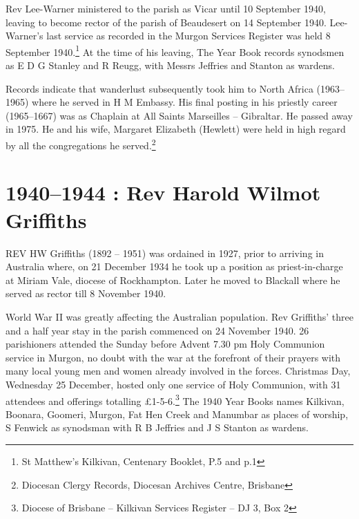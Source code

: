 Rev Lee-Warner ministered to the parish as Vicar until 10 September 1940, leaving to become rector of the parish of Beaudesert on 14 September 1940. Lee-Warner's last service as recorded in the Murgon Services Register was held 8 September 1940.\footnote{St Matthew's Kilkivan, Centenary Booklet, P.5 and p.1} At the time of his leaving, The Year Book records synodsmen as E D G Stanley and R Reugg, with Messrs Jeffries and Stanton as wardens.


Records indicate that wanderlust subsequently took him to North Africa (1963--1965) where he served in H M Embassy. His final posting in his priestly career (1965--1667) was as Chaplain at All Saints Marseilles -- Gibraltar. He passed away in 1975. He and his wife, Margaret Elizabeth (Hewlett) were held in high regard by all the congregations he served.\footnote{Diocesan Clergy Records, Diocesan Archives Centre, Brisbane}


\balance


\printendnotes[custom]
\setcounter{endnote}{0}
\chapter{1940--1944 : Rev Harold Wilmot Griffiths}
\nobalance


\lettrine[lines=3]{R}{EV}
 HW Griffiths (1892 -- 1951) was ordained in 1927, prior to arriving in Australia where, on 21 December 1934 he took up a position as priest-in-charge at Miriam Vale, diocese of Rockhampton. Later he moved to Blackall where he served as rector till 8 November 1940.

World War II was greatly affecting the Australian population. Rev Griffiths' three and a half year stay in the parish commenced on 24 November 1940. 26 parishioners attended the Sunday before Advent 7.30 pm Holy Communion service in Murgon, no doubt with the war at the forefront of their prayers with many local young men and women already involved in the forces. Christmas Day, Wednesday 25 December, hosted only one service of Holy Communion, with 31 attendees and offerings totalling \pounds1-5-6.\footnote{Diocese of Brisbane -- Kilkivan Services Register -- DJ 3, Box 2} The 1940 Year Books names Kilkivan, Boonara, Goomeri, Murgon, Fat Hen Creek and Manumbar as places of worship, S Fenwick as synodsman with R B Jeffries and J S Stanton as wardens.








